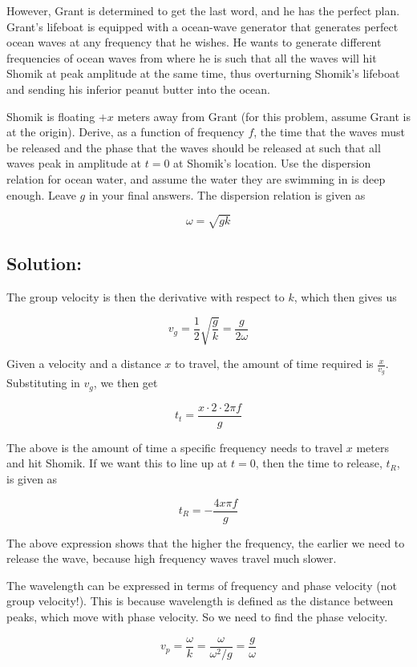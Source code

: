 \documentclass{article}
\begin{document}
However, Grant is determined to get the last word, and he has the perfect plan. Grant's lifeboat is equipped with a ocean-wave generator that generates perfect ocean waves at any frequency that he wishes. He wants to generate different frequencies of ocean waves from where he is such that all the waves will hit Shomik at peak amplitude at the same time, thus overturning Shomik's lifeboat and sending his inferior peanut butter into the ocean.

Shomik is floating $+x$ meters away from Grant (for this problem, assume Grant is at the origin). Derive, as a function of frequency $f$, the time that the waves must be released and the phase that the waves should be released at such that all waves peak in amplitude at $t = 0$ at Shomik's location. Use the dispersion relation for ocean water, and assume the water they are swimming in is deep enough. Leave $g$ in your final answers. The dispersion relation is given as

$$\omega = \sqrt{gk}$$

\subsection{Solution:}
The group velocity is then the derivative with respect to $k$, which then gives us

$$v_g = \frac{1}{2}\sqrt{\frac{g}{k}} = \frac{g}{2\omega}$$

Given a velocity and a distance $x$ to travel, the amount of time required is $\frac{x}{v_g}$. Substituting in $v_g$, we then get

$$t_t = \frac{x \cdot 2 \cdot 2 \pi f}{g}$$

The above is the amount of time a specific frequency needs to travel $x$ meters and hit Shomik. If we want this to line up at $t = 0$, then the time to release, $t_R$, is given as

$$\boxed{t_R = -\frac{4x \pi f}{g}}$$

The above expression shows that the higher the frequency, the earlier we need to release the wave, because high frequency waves travel much slower.

\vspace{1cm}

The wavelength can be expressed in terms of frequency and phase velocity (not group velocity!). This is because wavelength is defined as the distance between peaks, which move with phase velocity. So we need to find the phase velocity.

$$v_p = \frac{\omega}{k} = \frac{\omega}{\omega^2 / g} = \frac{g}{\omega}$$
\end{document}
